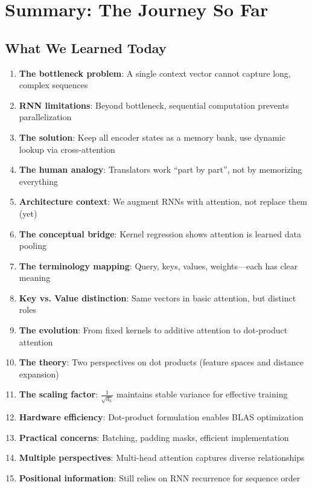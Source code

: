 \documentclass{article}
\begin{document}
\section{Summary: The Journey So Far}

\subsection{What We Learned Today}

\begin{enumerate}
    \item \textbf{The bottleneck problem}: A single context vector cannot capture long, complex sequences
    
    \item \textbf{RNN limitations}: Beyond bottleneck, sequential computation prevents parallelization
    
    \item \textbf{The solution}: Keep all encoder states as a memory bank, use dynamic lookup via cross-attention
    
    \item \textbf{The human analogy}: Translators work ``part by part'', not by memorizing everything
    
    \item \textbf{Architecture context}: We augment RNNs with attention, not replace them (yet)
    
    \item \textbf{The conceptual bridge}: Kernel regression shows attention is learned data pooling
    
    \item \textbf{The terminology mapping}: Query, keys, values, weights---each has clear meaning
    
    \item \textbf{Key vs. Value distinction}: Same vectors in basic attention, but distinct roles
    
    \item \textbf{The evolution}: From fixed kernels to additive attention to dot-product attention
    
    \item \textbf{The theory}: Two perspectives on dot products (feature spaces and distance expansion)
    
    \item \textbf{The scaling factor}: $\frac{1}{\sqrt{d_k}}$ maintains stable variance for effective training
    
    \item \textbf{Hardware efficiency}: Dot-product formulation enables BLAS optimization
    
    \item \textbf{Practical concerns}: Batching, padding masks, efficient implementation
    
    \item \textbf{Multiple perspectives}: Multi-head attention captures diverse relationships
    
    \item \textbf{Positional information}: Still relies on RNN recurrence for sequence order
\end{enumerate}
\end{document}
